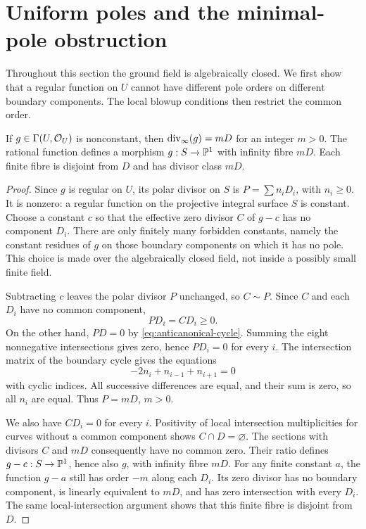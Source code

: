 \section{Uniform poles and the minimal-pole obstruction}\label{sec:poles}

Throughout this section the ground field is algebraically closed.
We first show that a regular function on \(U\) cannot have different
pole orders on different boundary components. The local blowup
conditions then restrict the common order.

\begin{lemma}\label{lem:uniform-poles}
If \(g\in\Gamma(U,\mathcal O_U)\) is nonconstant, then
\(\operatorname{div}_{\infty}(g)=mD\) for an integer \(m>0\).
The rational function defines a morphism \(g:S\to\mathbb P^1\) with
infinity fibre \(mD\). Each finite fibre is disjoint from \(D\)
and has divisor class \(mD\).
\end{lemma}

\begin{proof}
Since \(g\) is regular on \(U\), its polar divisor on \(S\) is
\(P=\sum n_iD_i\), with \(n_i\ge0\). It is nonzero: a regular
function on the projective integral surface \(S\) is constant.
Choose a constant \(c\) so that the effective zero divisor \(C\)
of \(g-c\) has no component \(D_i\). There are only finitely many
forbidden constants, namely the constant residues of \(g\) on those
boundary components on which it has no pole. This choice is made over
the algebraically closed field, not inside a possibly small finite field.

Subtracting \(c\) leaves the polar divisor \(P\) unchanged, so
\(C\sim P\). Since \(C\) and each \(D_i\) have no common
component,
\[
PD_i=CD_i\ge0.
\]
On the other hand, \(PD=0\) by \eqref{eq:anticanonical-cycle}.
Summing the eight nonnegative intersections gives zero, hence
\(PD_i=0\) for every \(i\). The intersection matrix of the
boundary cycle gives the equations
\[
-2n_i+n_{i-1}+n_{i+1}=0
\]
with cyclic indices. All successive differences are equal, and their
sum is zero, so all \(n_i\) are equal. Thus \(P=mD\), \(m>0\).

We also have \(CD_i=0\) for every \(i\). Positivity of local
intersection multiplicities for curves without a common component
shows \(C\cap D=\varnothing\). The sections with divisors \(C\)
and \(mD\) consequently have no common zero. Their ratio defines
\(g-c:S\to\mathbb P^1\), hence also \(g\), with infinity fibre \(mD\).
For any finite constant \(a\), the function \(g-a\) still has
order \(-m\) along each \(D_i\). Its zero divisor has no boundary
component, is linearly equivalent to \(mD\), and has zero intersection
with every \(D_i\). The same local-intersection argument shows that
this finite fibre is disjoint from \(D\).
\end{proof}

